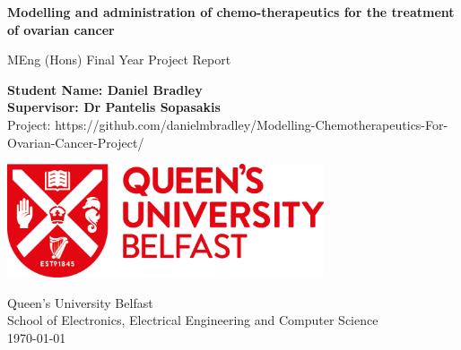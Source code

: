 \begin{titlepage}
	\begin{center}
        \vspace*{1cm}
            
        \Huge
        \textbf{Modelling and administration of chemo-therapeutics for the treatment of ovarian cancer}
            
        \vspace{0.5cm}
        \Huge
        MEng (Hons) Final Year Project Report
            
        \vspace{1.5cm}
        
        \Large    
        \textbf{Student Name: Daniel Bradley}\\
        \textbf{Supervisor: Dr Pantelis Sopasakis}\\
        \vspace{0.25cm}
        Project: https://github.com/danielmbradley/Modelling-Chemotherapeutics-For-Ovarian-Cancer-Project/
        \vfill
        \vspace{0.2cm}
        
        \includegraphics[width=0.7\textwidth]{Images/University_Logo}
            
        \vspace{0.1cm}
            
        \Large
        Queen's University Belfast\\
        School of Electronics, Electrical Engineering and Computer Science\\
        \today\\
        
    \end{center}
\end{titlepage}